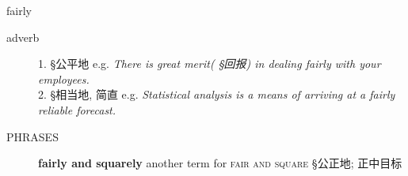 \documentclass[avery5372, grid]{flashcards}
\begin{document}
\begin{flashcard}[{\B 7 Habits} {\S 词汇}]{\Huge fairly}
\begin{description}
			
			
			
			
		\item[adverb] 
			
			1. {\S 公平地} e.g. \textit{There is great merit\textnormal{( {\S 回报})} in dealing fairly with your employees.}\\
			
			2. {\S 相当地, 简直} e.g. \textit{Statistical analysis is a means of arriving at a fairly reliable forecast.}\\
			
			
		\item[\textsc{PHRASES}] \textbf{fairly and squarely}  another term for \textsc{\B fair and square} {\S 公正地; 正中目标}
	\end{description}
\end{flashcard}





\end{document}
